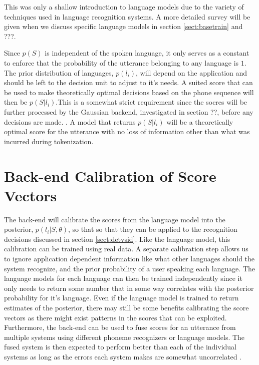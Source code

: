 This was only a shallow introduction to language models due to the variety of techniques used in language recognition systems. A more detailed survey will be given when we discuss specific language models in section \ref{sect:basetrain} and ???.




Since $p(S)$ is independent of the spoken language, it only serves as a constant to enforce that the probability of the utterance belonging to any language is $1$. The prior distribution of languages, $p(l_i)$, will depend on the application and should be left to the decision unit to adjust to it's needs. A suited score that can be used to make theoretically optimal decisions based on the phone sequence will then be $p(S|l_i)$.This is a somewhat strict requirement since the socres will be further processed by the Gaussian backend, investigated in section ??, before any decisions are made. . A model that returns $p(S|l_i)$ will be a theoretically optimal score for the utterance with no loss of information other than what was incurred during tokenization.




\section{Back-end Calibration of Score Vectors}
\label{sect:backendscoring}

The back-end will calibrate the scores from the language model into the posterior, $p(l_i | S, \theta)$, so that so that they can be applied to the recognition decisions discussed in section \ref{sect:detvsid}. Like the language model, this calibration can be trained using real data. A separate calibration step allows us to ignore application dependent information like what other languages should the system recognize, and the prior probability of a user speaking each language. The language models for each language can then be trained independently since it only needs to return some number that in some way correlates with the posterior probability for it's language. Even if the language model is trained to return estimates of the posterior, there may still be some benefits calibrating the score vectors \cite[820]{lidbok} as there might exist patterns in the scores that can be exploited. Furthermore, the back-end can be used to fuse scores for an utterance from multiple systems using different phoneme recognizers or language models. The fused system is then expected to perform better than each of the individual systems as long as the errors each system makes are somewhat uncorrelated \cite[818]{lidbok}.

